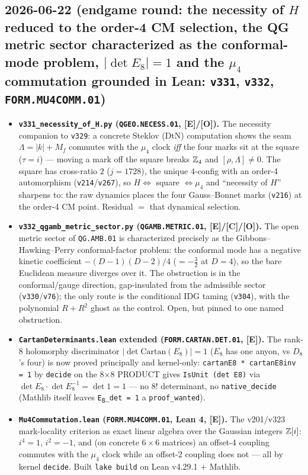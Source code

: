 \documentclass[11pt]{article}
\providecommand{\mE}{\textbf{[E]}}\providecommand{\mC}{\textbf{[C]}}
\providecommand{\mO}{\textbf{[O]}}\providecommand{\mX}{\textbf{[X]}}
\providecommand{\vref}[1]{\texttt{#1}}
\begin{document}
\subsection*{2026-06-22 (endgame round: the necessity of $H$ reduced to the order-4 CM selection, the QG metric sector characterized as the conformal-mode problem, $|\det E_8|{=}1$ and the $\mu_4$ commutation grounded in Lean: \texttt{v331}, \texttt{v332}, \texttt{FORM.MU4COMM.01})}
\begin{itemize}
\item \textbf{\texttt{v331\_necessity\_of\_H.py} (\texttt{QGEO.NECESS.01}, \mE/\mO).} The necessity companion to
  \texttt{v329}: a concrete Steklov (DtN) computation shows the seam $\Lambda{=}|k|{+}M_f$ commutes with the $\mu_4$
  clock \emph{iff} the four marks sit at the square ($\tau{=}i$) --- moving a mark off the square breaks $\mathbb{Z}_4$ and
  $[\rho,\Lambda]\neq0$.  The square has cross-ratio $2$ ($j{=}1728$), the unique $4$-config with an order-4
  automorphism (\vref{v214}/\vref{v267}), so $H\Leftrightarrow$ square $\Leftrightarrow\mu_4$ and ``necessity of
  $H$'' sharpens to: the raw dynamics places the four Gauss--Bonnet marks (\vref{v216}) at the order-4 CM point.
  Residual $=$ that dynamical selection.
\item \textbf{\texttt{v332\_qgamb\_metric\_sector.py} (\texttt{QGAMB.METRIC.01}, \mE/\mC/\mO).} The open metric sector
  of \texttt{QG.AMB.01} is characterized precisely as the Gibbons--Hawking--Perry conformal-factor problem: the
  conformal mode has a negative kinetic coefficient $-(D{-}1)(D{-}2)/4$ (${=}-\tfrac32$ at $D{=}4$), so the bare
  Euclidean measure diverges over it.  The obstruction is in the conformal/gauge direction, gap-insulated from the
  admissible sector (\vref{v330}/\vref{v76}); the only route is the conditional IDG taming (\vref{v304}), with the
  polynomial $R{+}R^2$ ghost as the control.  Open, but pinned to one named obstruction.
\item \textbf{\texttt{CartanDeterminants.lean} extended (\texttt{FORM.CARTAN.DET.01}, \mE).} The rank-8 holomorphy
  discriminator $|\det\mathrm{Cartan}(E_8)|{=}1$ ($E_8$ has one anyon, vs $D_8$'s four) is now proved principally and
  kernel-only: \texttt{cartanE8 * cartanE8inv = 1} by \texttt{decide} on the 8$\times$8 PRODUCT gives
  \texttt{IsUnit (det E8)} via $\det E_8\cdot\det E_8^{-1}{=}\det 1{=}1$ --- no 8! determinant, no
  \texttt{native\_decide} (Mathlib itself leaves \texttt{E\textsubscript{8}\_det = 1} a \texttt{proof\_wanted}).
\item \textbf{\texttt{Mu4Commutation.lean} (\texttt{FORM.MU4COMM.01}, Lean 4, \mE).} The v201/v323 mark-locality
  criterion as exact linear algebra over the Gaussian integers $\mathbb{Z}[i]$: $i^4{=}1$, $i^2{=}-1$, and (on concrete
  $6\times6$ matrices) an offset-4 coupling commutes with the $\mu_4$ clock while an offset-2 coupling does not ---
  all by kernel \texttt{decide}.  Built \texttt{lake build} on Lean v4.29.1 $+$ Mathlib.
\end{itemize}
\end{document}
